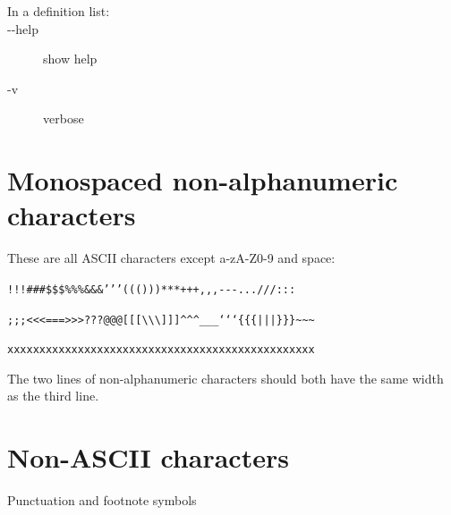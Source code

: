 \documentclass[a4paper]{article}
\providecommand*{\DUoptionlistlabel}[1]{\bfseries #1 \hfill}
\newenvironment{DUoptionlist}{%
    \list{}{\setlength{\labelwidth}{\DUoptionlistindent}
            \setlength{\rightmargin}{1cm}
            \setlength{\leftmargin}{\rightmargin}
            \addtolength{\leftmargin}{\labelwidth}
            \addtolength{\leftmargin}{\labelsep}
            \renewcommand{\makelabel}{\DUoptionlistlabel}}
  }
  {\endlist}
\begin{document}
\begin{description}
\item[{In a definition list:}] \leavevmode
\begin{DUoptionlist}
\item[-{}-help]  show help

\item[-v]  verbose
\end{DUoptionlist}

\end{description}


\section{Monospaced non-alphanumeric characters%
  \label{monospaced-non-alphanumeric-characters}%
}

These are all ASCII characters except a-zA-Z0-9 and space:

\texttt{!!!\textquotedbl{}\textquotedbl{}\textquotedbl{}\#\#\#\$\$\$\%\%\%\&\&\&'{}'{}'((()))***+++,{},{},-{}-{}-...///:::}

\texttt{;;;<{}<{}<===>{}>{}>???@@@{[}{[}{[}\textbackslash{}\textbackslash{}\textbackslash{}{]}{]}{]}\textasciicircum{}\textasciicircum{}\textasciicircum{}\_\_\_`{}`{}`\{\{\{|||\}\}\}\textasciitilde{}\textasciitilde{}\textasciitilde{}}

\texttt{xxxxxxxxxxxxxxxxxxxxxxxxxxxxxxxxxxxxxxxxxxxxxxxx}

The two lines of non-alphanumeric characters should both have the same
width as the third line.


\section{Non-ASCII characters%
  \label{non-ascii-characters}%
}

Punctuation and footnote symbols
\end{document}
